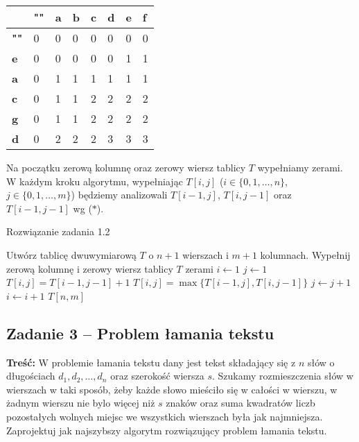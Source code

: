 \begin{table}[H]
	\center
	\begin{tabular}{|l|lllllll|}
		\hline
		& \multicolumn{1}{l|}{\textbf{""}} & \multicolumn{1}{l|}{\textbf{a}} & \multicolumn{1}{l|}{\textbf{b}} & \multicolumn{1}{l|}{\textbf{c}} & \multicolumn{1}{l|}{\textbf{d}} & \multicolumn{1}{l|}{\textbf{e}} & \multicolumn{1}{l|}{\textbf{f}} \\ \hline
		\textbf{""} & 0 & 0 & 0 & 0 & 0 & 0 & 0 \\ \cline{1-1}
		\textbf{e}  & 0 & 0 & 0 & 0 & 0 & 1 & 1 \\ \cline{1-1}
		\textbf{a}  & 0 & 1 & 1 & 1 & 1 & 1 & 1 \\ \cline{1-1}
		\textbf{c}  & 0 & 1 & 1 & 2 & 2 & 2 & 2 \\ \cline{1-1}
		\textbf{g}  & 0 & 1 & 1 & 2 & 2 & 2 & 2 \\ \cline{1-1}
		\textbf{d}  & 0 & 2 & 2 & 2 & 3 & 3 & 3 \\ \cline{1-1}
		\hline
	\end{tabular}
	\caption{}
	\label{tab_zad12}
\end{table}

Na początku zerową kolumnę oraz zerowy wiersz tablicy $T$
wypełniamy zerami. W każdym kroku algorytmu, wypełniając $T[i, j]$
($i \in \{0,1, \dots, n\}$, $j \in \{0,1, \dots, m\}$)
będziemy analizowali $T[i-1, j]$, $T[i, j-1]$ oraz $T[i-1,j-1]$ wg ($\ast$).


\begin{algorithm}[H]
	\caption{Rozwiązanie zadania 1.2}\label{Zadanie12}
	\begin{algorithmic}[1]
		\State Utwórz tablicę dwuwymiarową $T$ o $n+1$ wierszach i $m+1$ kolumnach.
		\State Wypełnij zerową kolumnę i zerowy wiersz tablicy $T$ zerami
		\State $i \gets 1$
		\State $j \gets 1$
		\State $T[i, j] = T[i-1,j-1] + 1$
		\Else
		\State $T[i, j] = \max\{T[i-1,j], T[i,j-1]\}$
		\EndIf
		\State $j \gets j + 1$
		\EndWhile
		\State $i \gets i + 1$
		\EndWhile
		\State \Return $T[n, m]$
		\EndProcedure 
	\end{algorithmic}
\end{algorithm}


\subsection{Zadanie 3 -- Problem łamania tekstu}
\textbf{Treść:} W problemie łamania tekstu dany jest tekst składający się z $n$
słów o długościach $d_1, d_2, \ldots , d_n$ oraz
szerokość wiersza $s$. Szukamy rozmieszczenia słów w wierszach w taki 
sposób, żeby każde słowo mieściło się w całości
w wierszu, w żadnym wierszu nie bylo więcej niż $s$ znaków 
oraz suma kwadratów liczb pozostałych wolnych miejsc we
wszystkich wierszach była jak najmniejsza.
Zaprojektuj jak najszybszy algorytm rozwiązujący problem łamania tekstu.

